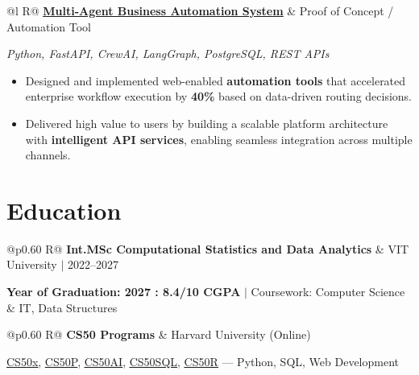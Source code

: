 \documentclass[a4paper,10pt]{article}
\newcommand{\ulink}[2]{\href{#1}{\uline{#2}}}
\newcommand{\subheading}[1]{{\color[HTML]{0A0A0A}\fontsize{12}{14}\selectfont\bfseries #1}}
\newcommand{\techstack}[1]{{\color[HTML]{5C5C5C}\fontsize{10.5}{12.5}\selectfont\itshape #1}}
\newcommand{\meta}[1]{{\color[HTML]{5C5C5C}\fontsize{10.5}{12.5}\selectfont #1}}
\begin{document}
\begin{tabularx}{\linewidth}{@{}l R@{}}
\subheading{\ulink{https://github.com/su-jin1425/Multi-Agent-Business-Automation}{Multi-Agent Business Automation System}} & \meta{Proof of Concept / Automation Tool}
\end{tabularx}
\vspace{1pt}
\techstack{Python, FastAPI, CrewAI, LangGraph, PostgreSQL, REST APIs}
\begin{itemize}[nosep, leftmargin=1.5em, itemsep=1pt, topsep=2pt]
  \item {\color[HTML]{0A0A0A}\fontsize{11}{14}\selectfont Designed and implemented web-enabled \textbf{automation tools} that accelerated enterprise workflow execution by \textbf{40\%} based on data-driven routing decisions.}
  \item {\color[HTML]{0A0A0A}\fontsize{11}{14}\selectfont Delivered high value to users by building a scalable platform architecture with \textbf{intelligent API services}, enabling seamless integration across multiple channels.}
\end{itemize}

\vspace{1pt}

\section{Education}
\vspace{1pt}

\begin{tabularx}{\linewidth}{@{}p{0.60\linewidth} R@{}}
\subheading{Int.MSc Computational Statistics and Data Analytics} & \meta{VIT University $|$ 2022--2027}
\end{tabularx}
\vspace{1pt}
{\color[HTML]{3A3A3A}\fontsize{11}{14}\selectfont \textbf{Year of Graduation: 2027 : 8.4/10 CGPA} $|$ Coursework: Computer Science \& IT, Data Structures}

\begin{tabularx}{\linewidth}{@{}p{0.60\linewidth} R@{}}
\subheading{CS50 Programs} & \meta{Harvard University (Online)}
\end{tabularx}
\vspace{1pt}
{\color[HTML]{3A3A3A}\fontsize{11}{14}\selectfont \ulink{https://cs50.harvard.edu/certificates/b14b78df-e05c-413e-a607-1dd27303053a}{CS50x}, \ulink{https://cs50.harvard.edu/certificates/32477052-9db4-49c4-a5a4-d7e58429ca2c}{CS50P}, \ulink{https://cs50.harvard.edu/certificates/9cdb4d4a-1250-4f8e-9fd7-191864e0f919}{CS50AI}, \ulink{https://cs50.harvard.edu/certificates/bc486f24-f085-4e61-8536-80940b97a1b9}{CS50SQL}, \ulink{https://cs50.harvard.edu/certificates/666838e6-a053-4d82-b179-a60fe745fd84}{CS50R} --- Python, SQL, Web Development}
\end{document}
